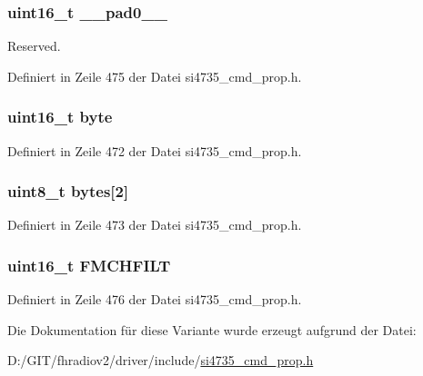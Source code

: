 \subsubsection[{\+\_\+\+\_\+pad0\+\_\+\+\_\+}]{\setlength{\rightskip}{0pt plus 5cm}uint16\+\_\+t \+\_\+\+\_\+pad0\+\_\+\+\_\+}\label{unionfm__channel__filter_a77132c2c26a75f5b8751b235cda23828}


Reserved. 



Definiert in Zeile 475 der Datei si4735\+\_\+cmd\+\_\+prop.\+h.

\hypertarget{unionfm__channel__filter_ab0549c1b5ea980a02e7eab77e21fea49}{}
\subsubsection[{byte}]{\setlength{\rightskip}{0pt plus 5cm}uint16\+\_\+t byte}\label{unionfm__channel__filter_ab0549c1b5ea980a02e7eab77e21fea49}


Definiert in Zeile 472 der Datei si4735\+\_\+cmd\+\_\+prop.\+h.

\hypertarget{unionfm__channel__filter_a46e4c05d20a047ec169f60d3167e912e}{}
\subsubsection[{bytes}]{\setlength{\rightskip}{0pt plus 5cm}uint8\+\_\+t bytes\mbox{[}2\mbox{]}}\label{unionfm__channel__filter_a46e4c05d20a047ec169f60d3167e912e}


Definiert in Zeile 473 der Datei si4735\+\_\+cmd\+\_\+prop.\+h.

\hypertarget{unionfm__channel__filter_a584b5186edaab50c1b4bbc2fea4d0a3b}{}
\subsubsection[{F\+M\+C\+H\+F\+I\+L\+T}]{\setlength{\rightskip}{0pt plus 5cm}uint16\+\_\+t F\+M\+C\+H\+F\+I\+L\+T}\label{unionfm__channel__filter_a584b5186edaab50c1b4bbc2fea4d0a3b}


Definiert in Zeile 476 der Datei si4735\+\_\+cmd\+\_\+prop.\+h.



Die Dokumentation für diese Variante wurde erzeugt aufgrund der Datei\+:\begin{DoxyCompactItemize}
\item 
D\+:/\+G\+I\+T/fhradiov2/driver/include/\hyperlink{si4735__cmd__prop_8h}{si4735\+\_\+cmd\+\_\+prop.\+h}\end{DoxyCompactItemize}
